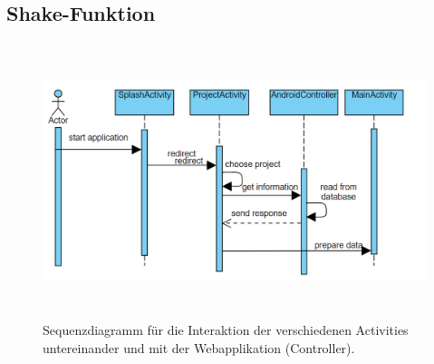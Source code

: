 \subsection{Shake-Funktion}

\begin{figure}[tp]
  \centering
  \includegraphics[height=8cm]{images/seqAct.PNG}
 \caption[Sequenzdiagramm für die Interaktion der verschiedenen Activities untereinander und mit der Webapplikation.]{Sequenzdiagramm für die Interaktion der verschiedenen Activities untereinander und mit der Webapplikation (Controller).}
  \label{fig:popup}
\end{figure}


\chapterend
